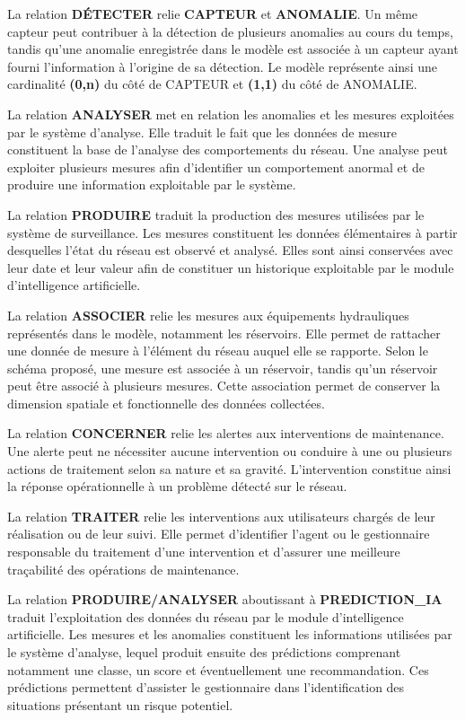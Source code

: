La relation \textbf{DÉTECTER} relie \textbf{CAPTEUR} et
\textbf{ANOMALIE}. Un même capteur peut contribuer à la détection de
plusieurs anomalies au cours du temps, tandis qu'une anomalie enregistrée
dans le modèle est associée à un capteur ayant fourni l'information à
l'origine de sa détection. Le modèle représente ainsi une cardinalité
\textbf{(0,n)} du côté de CAPTEUR et \textbf{(1,1)} du côté de ANOMALIE.

La relation \textbf{ANALYSER} met en relation les anomalies et les
mesures exploitées par le système d'analyse. Elle traduit le fait que les
données de mesure constituent la base de l'analyse des comportements du
réseau. Une analyse peut exploiter plusieurs mesures afin d'identifier
un comportement anormal et de produire une information exploitable par
le système.

La relation \textbf{PRODUIRE} traduit la production des mesures utilisées
par le système de surveillance. Les mesures constituent les données
élémentaires à partir desquelles l'état du réseau est observé et analysé.
Elles sont ainsi conservées avec leur date et leur valeur afin de
constituer un historique exploitable par le module d'intelligence
artificielle.

La relation \textbf{ASSOCIER} relie les mesures aux équipements
hydrauliques représentés dans le modèle, notamment les réservoirs. Elle
permet de rattacher une donnée de mesure à l'élément du réseau auquel
elle se rapporte. Selon le schéma proposé, une mesure est associée à un
réservoir, tandis qu'un réservoir peut être associé à plusieurs mesures.
Cette association permet de conserver la dimension spatiale et
fonctionnelle des données collectées.

La relation \textbf{CONCERNER} relie les alertes aux interventions de
maintenance. Une alerte peut ne nécessiter aucune intervention ou
conduire à une ou plusieurs actions de traitement selon sa nature et sa
gravité. L'intervention constitue ainsi la réponse opérationnelle à un
problème détecté sur le réseau.

La relation \textbf{TRAITER} relie les interventions aux utilisateurs
chargés de leur réalisation ou de leur suivi. Elle permet d'identifier
l'agent ou le gestionnaire responsable du traitement d'une intervention
et d'assurer une meilleure traçabilité des opérations de maintenance.

La relation \textbf{PRODUIRE/ANALYSER} aboutissant à
\textbf{PREDICTION\_IA} traduit l'exploitation des données du réseau par
le module d'intelligence artificielle. Les mesures et les anomalies
constituent les informations utilisées par le système d'analyse, lequel
produit ensuite des prédictions comprenant notamment une classe, un
score et éventuellement une recommandation. Ces prédictions permettent
d'assister le gestionnaire dans l'identification des situations
présentant un risque potentiel.

